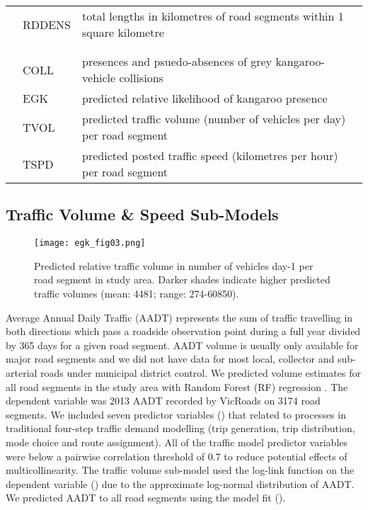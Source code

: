 \begin{table}[htp]
\begin{tabularx}{0.9\textwidth}{llY}
           		 &RDDENS      &total lengths in kilometres of road segments within 1 square kilometre\\
&&\\
&&\\
  		 &COLL        &presences and psuedo-absences of grey kangaroo-vehicle collisions\\
           		 &EGK         &predicted relative likelihood of kangaroo presence\\
           		 &TVOL        &predicted traffic volume (number of vehicles per day) per road segment\\
           		 &TSPD        &predicted posted traffic speed (kilometres per hour) per road segment\\
\bottomrule
\end{tabularx}
\label{egk_variables}
\end{table}

\subsection{Traffic Volume \& Speed Sub-Models}

\begin{figure*}[htp]
  \centering
  \texttt{[image: egk\_fig03.png]}
  \caption[Predicted relative traffic volume in Victoria]{Predicted relative traffic volume in number of vehicles day-1 per road segment in study area. Darker shades indicate higher predicted traffic volumes (mean: 4481; range: 274-60850).}
  \label{egk_tvolmap}
\end{figure*}

Average Annual Daily Traffic (AADT) represents the sum of traffic travelling in both directions which pass a roadside observation point during a full year divided by 365 days for a given road segment. AADT volume is usually only available for major road segments and we did not have data for most local, collector and sub-arterial roads under municipal district control. We predicted volume estimates for all road segments in the study area with Random Forest (RF) regression \citep{brei01}. The dependent variable was 2013 AADT recorded by VicRoads on 3174 road segments. We included seven predictor variables () that related to processes in traditional four-step traffic demand modelling (trip generation, trip distribution, mode choice and route assignment). All of the traffic model predictor variables were below a pairwise correlation threshold of 0.7 to reduce potential effects of multicollinearity. The traffic volume sub-model used the log-link function on the dependent variable () due to the approximate log-normal distribution of AADT. We predicted AADT to all road segments using the model fit ().

